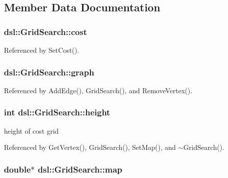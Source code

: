 \subsection{Member Data Documentation}
\subsubsection[{cost}]{ dsl\-::\-Grid\-Search\-::cost\hspace{0.3cm}{\ttfamily [protected]}}\label{classdsl_1_1GridSearch_ae4b06b2ddfc295598fcfe0da68f769ff}


Referenced by Set\-Cost().

\subsubsection[{graph}]{ dsl\-::\-Grid\-Search\-::graph\hspace{0.3cm}{\ttfamily [protected]}}\label{classdsl_1_1GridSearch_ad465ba46be970dae903d4d1c5ad76e35}


Referenced by Add\-Edge(), Grid\-Search(), and Remove\-Vertex().

\subsubsection[{height}]{\setlength{\rightskip}{0pt plus 5cm}int dsl\-::\-Grid\-Search\-::height}\label{classdsl_1_1GridSearch_a765e59bd8afcd6cb983a9cee73d8ab12}


height of cost grid 



Referenced by Get\-Vertex(), Grid\-Search(), Set\-Map(), and $\sim$\-Grid\-Search().

\subsubsection[{map}]{\setlength{\rightskip}{0pt plus 5cm}double$\ast$ dsl\-::\-Grid\-Search\-::map}\label{classdsl_1_1GridSearch_acba55fef9aa96238a8047569b4c9aba0}


